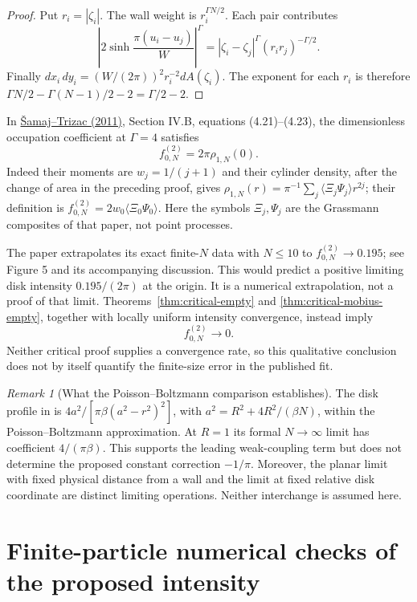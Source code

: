 \documentclass[11pt,a4paper]{article}
\numberwithin{equation}{section}
\theoremstyle{definition}
\theoremstyle{remark}
\newtheorem{remark}[theorem]{Remark}
\begin{document}
\begin{proof}
Put $r_i=|\zeta_i|$.  The wall weight is
$r_i^{\Gamma N/2}$.  Each pair contributes
\[
 \left|2\sinh\frac{\pi(u_i-u_j)}W\right|^\Gamma
 =|\zeta_i-\zeta_j|^\Gamma(r_i r_j)^{-\Gamma/2}.
\]
Finally $dx_i\,dy_i=(W/(2\pi))^2r_i^{-2}dA(\zeta_i)$.
The exponent for each $r_i$ is therefore
$\Gamma N/2-\Gamma(N-1)/2-2=\Gamma/2-2$.
\end{proof}

In \href{https://arxiv.org/pdf/1012.4983}{\v{S}amaj--Trizac (2011)},
Section IV.B, equations (4.21)--(4.23), the dimensionless occupation
coefficient at $\Gamma=4$ satisfies
\[
 f^{(2)}_{0,N}=2\pi\rho_{1,N}(0).
\]
Indeed their moments are $w_j=1/(j+1)$ and their cylinder density,
after the change of area in the preceding proof, gives
$\rho_{1,N}(r)=\pi^{-1}\sum_j\langle\Xi_j\Psi_j\rangle r^{2j}$;
their definition is $f^{(2)}_{0,N}=2w_0\langle\Xi_0\Psi_0\rangle$.
Here the symbols $\Xi_j,\Psi_j$ are the Grassmann composites of that
paper, not point processes.

The paper extrapolates its exact finite-$N$ data with $N\le10$ to
$f^{(2)}_{0,N}\to0.195$; see Figure 5 and its accompanying discussion.
This would predict a positive limiting disk intensity
$0.195/(2\pi)$ at the origin.  It is a numerical extrapolation, not a
proof of that limit.  Theorems~\ref{thm:critical-empty} and
\ref{thm:critical-mobius-empty}, together with locally uniform intensity
convergence, instead imply
\[
 f^{(2)}_{0,N}\longrightarrow0.
\]
Neither critical proof supplies a convergence rate, so this qualitative
conclusion does not by itself quantify the finite-size error in the
published fit.

\begin{remark}[What the Poisson--Boltzmann comparison establishes]
The disk profile in \cite[Section 4.2]{Samaj} is
$4a^2/[\pi\beta(a^2-r^2)^2]$, with
$a^2=R^2+4R^2/(\beta N)$, within the Poisson--Boltzmann approximation.
At $R=1$ its formal $N\to\infty$ limit has coefficient
$4/(\pi\beta)$.  This supports the leading weak-coupling term but
does not determine the proposed constant correction $-1/\pi$.
Moreover, the planar limit with fixed physical distance from a wall
and the limit at fixed relative disk coordinate are distinct limiting
operations.  Neither interchange is assumed here.
\end{remark}


\section{Finite-particle numerical checks of the proposed intensity}
\label{sec:intensity-finite-n-numerics}
\end{document}
